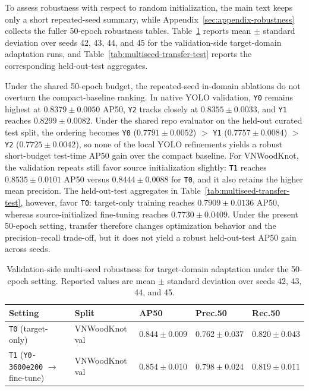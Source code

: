 \documentclass[10pt,a4paper]{article}
\begin{document}
To assess robustness with respect to random initialization, the main text keeps only a short repeated-seed summary, while Appendix~\ref{sec:appendix-robustness} collects the fuller 50-epoch robustness tables. Table~\ref{tab:multiseed-current} reports mean $\pm$ standard deviation over seeds 42, 43, 44, and 45 for the validation-side target-domain adaptation runs, and Table~\ref{tab:multiseed-transfer-test} reports the corresponding held-out-test aggregates.

Under the shared 50-epoch budget, the repeated-seed in-domain ablations do not overturn the compact-baseline ranking. In native YOLO validation, \texttt{Y0} remains highest at $0.8379 \pm 0.0050$ AP50, \texttt{Y2} tracks closely at $0.8355 \pm 0.0033$, and \texttt{Y1} reaches $0.8299 \pm 0.0082$. Under the shared repo evaluator on the held-out curated test split, the ordering becomes \texttt{Y0} ($0.7791 \pm 0.0052$) $>$ \texttt{Y1} ($0.7757 \pm 0.0084$) $>$ \texttt{Y2} ($0.7725 \pm 0.0042$), so none of the local YOLO refinements yields a robust short-budget test-time AP50 gain over the compact baseline. For VNWoodKnot, the validation repeats still favor source initialization slightly: \texttt{T1} reaches $0.8535 \pm 0.0101$ AP50 versus $0.8444 \pm 0.0088$ for \texttt{T0}, and it also retains the higher mean precision. The held-out-test aggregates in Table~\ref{tab:multiseed-transfer-test}, however, favor \texttt{T0}: target-only training reaches $0.7909 \pm 0.0136$ AP50, whereas source-initialized fine-tuning reaches $0.7730 \pm 0.0409$. Under the present 50-epoch setting, transfer therefore changes optimization behavior and the precision--recall trade-off, but it does not yield a robust held-out-test AP50 gain across seeds.

\begin{table}[t]
  \centering
  \caption{Validation-side multi-seed robustness for target-domain adaptation under the 50-epoch setting. Reported values are mean $\pm$ standard deviation over seeds 42, 43, 44, and 45.}
  \label{tab:multiseed-current}
  \scriptsize
  \setlength{\tabcolsep}{4pt}
  \begin{tabularx}{\textwidth}{>{\raggedright\arraybackslash}p{} >{\raggedright\arraybackslash}p{} >{\raggedright\arraybackslash}p{} >{\raggedright\arraybackslash}p{} X}
    \toprule
    Setting & Split & AP50 & Prec.50 & Rec.50 \\
    \midrule
    \texttt{T0} (target-only) & VNWoodKnot val & $0.844 \pm 0.009$ & $0.762 \pm 0.037$ & $0.820 \pm 0.043$ \\
    \texttt{T1} (\texttt{Y0-3600e200} $\rightarrow$ fine-tune) & VNWoodKnot val & $0.854 \pm 0.010$ & $0.798 \pm 0.024$ & $0.819 \pm 0.011$ \\
    \bottomrule
  \end{tabularx}
\end{table}
\end{document}
